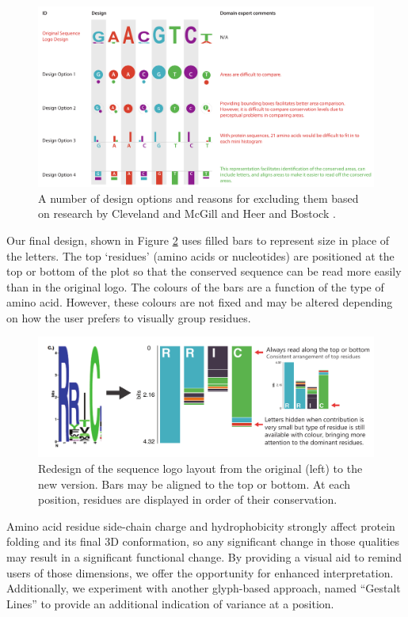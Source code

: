\begin{figure}[t!]
\centering
\includegraphics[width=\textwidth]{images/other_glyphs/sequence_logo/design_options}
\caption{A number of design options and reasons for excluding them based on research by Cleveland and McGill \cite{cleveland1984graphical} and Heer and Bostock \cite{heer2010crowdsourcing}.}
\label{fig:sequence_design_options}
\end{figure}

Our final design, shown in Figure \ref{fig:sequence-logo-design} uses filled bars to represent size in place of the letters.
The top `residues' (amino acids or nucleotides) are positioned at the top or bottom of the plot so that the conserved sequence can be read more easily than in the original logo.
The colours of the bars are a function of the type of amino acid.
However, these colours are not fixed and may be altered depending on how the user prefers to visually group residues.

\begin{figure}[b!]
\centering
\includegraphics[width=.75\textwidth]{images/other_glyphs/sequence_logo/sequence-logo-design}
\caption{Redesign of the sequence logo layout from the original (left) to the new version. Bars may be aligned to the top or bottom. At each position, residues are displayed in order of their conservation.}
\label{fig:sequence-logo-design}
\end{figure}

Amino acid residue side-chain charge and hydrophobicity strongly affect protein folding and its final 3D conformation, so any significant change in those qualities may result in a significant functional change.
By providing a visual aid to remind users of those dimensions, we offer the opportunity for enhanced interpretation.
Additionally, we experiment with another glyph-based approach, named ``Gestalt Lines'' \cite{brandes2013gestaltlines} to provide an additional indication of variance at a position. 

